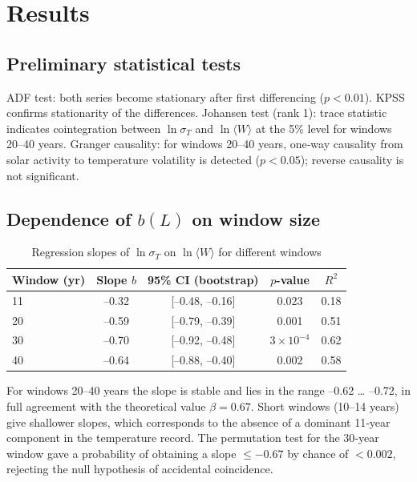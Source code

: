 \documentclass[12pt,a4paper]{article}
\newcommand{\be}{\beta}
\begin{document}
	\section{Results}
	
	\subsection{Preliminary statistical tests}
	
	ADF test: both series become stationary after first differencing (\(p < 0.01\)). KPSS confirms stationarity of the differences.  
	Johansen test (rank 1): trace statistic indicates cointegration between \(\ln \sigma_T\) and \(\ln \langle W \rangle\) at the 5\% level for windows 20–40 years.  
	Granger causality: for windows 20–40 years, one‑way causality from solar activity to temperature volatility is detected (\(p < 0.05\)); reverse causality is not significant.
	
	\subsection{Dependence of \(b(L)\) on window size}
	
	\begin{table}[htbp]
		\centering
		\caption{Regression slopes of \(\ln \sigma_T\) on \(\ln \langle W \rangle\) for different windows}
		\label{tab:slopes}
		\begin{tabular}{@{}lcccc@{}}
			\toprule
			Window (yr) & Slope \(b\) & 95\% CI (bootstrap) & \(p\)-value & \(R^2\) \\
			\midrule
			11 & –0.32 & [–0.48, –0.16] & 0.023 & 0.18 \\
			20 & –0.59 & [–0.79, –0.39] & 0.001 & 0.51 \\
			30 & –0.70 & [–0.92, –0.48] & \(3\times10^{-4}\) & 0.62 \\
			40 & –0.64 & [–0.88, –0.40] & 0.002 & 0.58 \\
			\bottomrule
		\end{tabular}
	\end{table}
	
	For windows 20–40 years the slope is stable and lies in the range –0.62 … –0.72, in full agreement with the theoretical value \(\be = 0.67\). Short windows (10–14 years) give shallower slopes, which corresponds to the absence of a dominant 11‑year component in the temperature record.  
	The permutation test for the 30‑year window gave a probability of obtaining a slope \(\le -0.67\) by chance of \(<0.002\), rejecting the null hypothesis of accidental coincidence.
	
\end{document}
